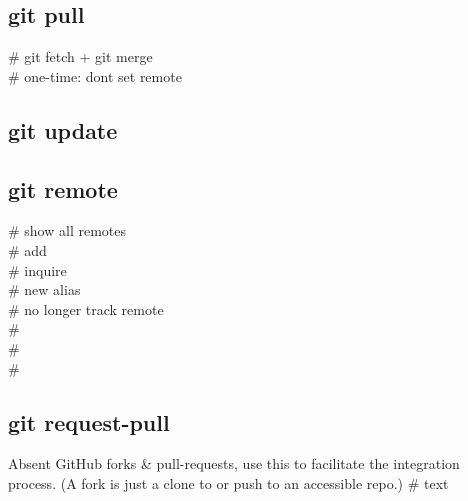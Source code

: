 \subsection*{git pull}
 \# git fetch + git merge \\
 \# one-time: don\textquotesingle t set remote\\


\subsection*{git update}



\subsection*{git remote}
 \# show all remotes \\
 \# add \\
 \# inquire \\
 \# new alias \\
 \# no longer track remote \\
 \# \\
 \# \\
 \# \\


\subsection*{git request-pull}
Absent GitHub forks \& pull-requests, use this to facilitate the integration process. (A fork is just a clone to or push to an accessible repo.)
 \# text\\

